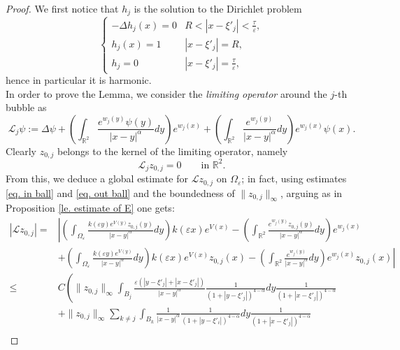 \documentclass[11pt]{article}
\begin{document}
\begin{proof}
We first notice that $h_j$ is the solution to the Dirichlet problem
$$\left\{\begin{array}{ll}-\Delta h_j(x)=0&R<\left|x-\xi'_j\right|<\frac\tau\varepsilon,\\h_j(x)=1&\left|x-\xi'_j\right|=R,\\h_j=0&\left|x-\xi'_j\right|=\frac\tau\varepsilon,\end{array}\right.$$
hence in particular it is harmonic.\\
In order to prove the Lemma, we consider the \emph{limiting operator} around the $j$-th bubble as
\begin{equation}
\label{lj}\mathcal L_j\psi:=\Delta\psi+\left(\int_{\mathbb R^2}\frac{e^{w_j(y)}\psi(y)}{|x-y|^\alpha}dy\right)e^{w_j(x)}+\left(\int_{\mathbb R^2}\frac{e^{w_j(y)}}{|x-y|^\alpha}dy\right)e^{w_j(x)}\psi(x).
\end{equation}
Clearly $z_{0,j}$ belongs to the kernel of the limiting operator, namely
\begin{equation}\label{eq. inve2 1}
\mathcal L_jz_{0,j}=0\qquad\text{in }\mathbb R^2.
\end{equation}
From this, we deduce a global estimate for $\mathcal Lz_{0,j}$ on $\Omega_\varepsilon$; in fact, using estimates \eqref{eq. in ball} and \eqref{eq. out ball} and the boundedness of $\|z_{0,j}\|_\infty$, arguing as in Proposition \ref{le. estimate of E} one gets:
\begin{align}
\nonumber|\mathcal Lz_{0,j}|=&\left|\left(\int_{\Omega_\varepsilon}\frac{k(\varepsilon y)e^{V(y)}z_{0,j}(y)}{|x-y|^\alpha}dy\right)k(\varepsilon x)e^{V(x)}-\left(\int_{\mathbb R^2}\frac{e^{w_j(y)}z_{0,j}(y)}{|x-y|^\alpha}dy\right)e^{w_j(x)}\right.\\
\nonumber&\left.+\left(\int_{\Omega_\varepsilon}\frac{k(\varepsilon y)e^{V(y)}}{|x-y|^\alpha}dy\right)k(\varepsilon x)e^{V(x)}z_{0,j}(x)-\left(\int_{\mathbb R^2}\frac{e^{w_j(y)}}{|x-y|^\alpha}dy\right)e^{w_j(x)}z_{0,j}(x)\right|\\
\nonumber\le&C\left(\|z_{0,j}\|_\infty\int_{B_j}\frac{\varepsilon\left(\left|y-\xi'_j\right|+\left|x-\xi'_j\right|\right)}{|x-y|^\alpha}\frac1{\left(1+\left|y-\xi'_j\right|\right)^{4-\alpha}}dy\frac1{\left(1+\left|x-\xi'_j\right|\right)^{4-\alpha}}\right.\\
\nonumber&+\left.\|z_{0,j}\|_\infty\sum_{k\ne j}\int_{B_k}\frac1{|x-y|^\alpha}\frac1{(1+|y-\xi'_i|)^{4-\alpha}}dy\frac1{\left(1+\left|x-\xi'_j\right|\right)^{4-\alpha}}\right.\\

\end{align}
\end{proof}
\end{document}
